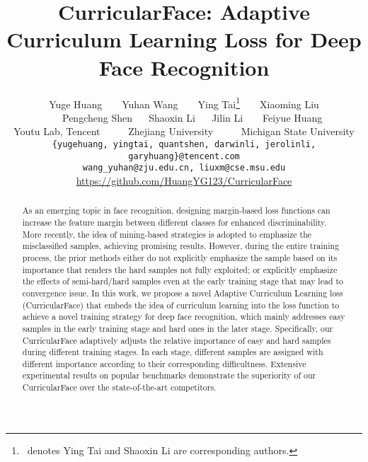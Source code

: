 \documentclass[10pt,twocolumn,letterpaper]{article}
\begin{document}
\title{CurricularFace: Adaptive Curriculum Learning Loss for Deep Face Recognition}

\author{Yuge Huang ~ ~ Yuhan Wang ~ ~ Ying Tai\thanks{~denotes Ying Tai and Shaoxin Li are corresponding authors.} ~ ~ Xiaoming Liu\\
 ~ ~ Pengcheng Shen~ ~ Shaoxin Li~ ~ Jilin Li  ~ ~ Feiyue Huang\\
Youtu Lab, Tencent  ~ ~ ~  Zhejiang University ~ ~ ~ Michigan State University \\
{\tt\small \{yugehuang, yingtai, quantshen, darwinli, jerolinli, garyhuang\}@tencent.com} \\
{\tt\small wang_yuhan@zju.edu.cn, liuxm@cse.msu.edu}\\
{\small \url{https://github.com/HuangYG123/CurricularFace}}
}

\maketitle


\begin{abstract}
As an emerging topic in face recognition, designing margin-based loss functions can increase the feature margin between different classes for enhanced discriminability.
More recently, the idea of mining-based strategies is adopted to emphasize the misclassified samples, achieving promising results.
However, during the entire training process, the prior methods either do not explicitly emphasize the sample based on its importance that renders the hard samples not fully exploited; or explicitly emphasize the effects of semi-hard/hard samples even at the early training stage that may lead to convergence issue.
In this work, we propose a novel Adaptive Curriculum Learning loss (CurricularFace) that embeds the idea of curriculum learning into the loss function to achieve a novel training strategy for deep face recognition, which mainly addresses easy samples in the early training stage and hard ones in the later stage.
Specifically, our CurricularFace adaptively adjusts the relative importance of easy and hard samples during different training stages.
In each stage, different samples are assigned with different importance according to their corresponding difficultness.
Extensive experimental results on popular benchmarks demonstrate the superiority of our CurricularFace over the state-of-the-art competitors.
\end{abstract}
\end{document}
